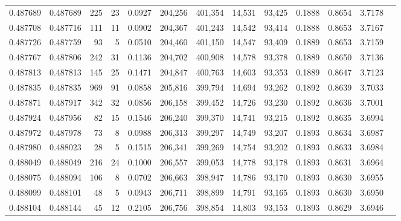 \begin{tabular}{rrrrrrrrrrrrr}
0.487689 & 0.487689 &   225 &    23 &                                     0.0927 & 204,256 & 401,354 &  14,531 &  93,425 & 0.1888 & 0.8654 & 3.7178 \\
0.487708 & 0.487716 &   111 &    11 &                                     0.0902 & 204,367 & 401,243 &  14,542 &  93,414 & 0.1888 & 0.8653 & 3.7167 \\
0.487726 & 0.487759 &    93 &     5 &                                     0.0510 & 204,460 & 401,150 &  14,547 &  93,409 & 0.1889 & 0.8653 & 3.7159 \\
0.487767 & 0.487806 &   242 &    31 &                                     0.1136 & 204,702 & 400,908 &  14,578 &  93,378 & 0.1889 & 0.8650 & 3.7136 \\
0.487813 & 0.487813 &   145 &    25 &                                     0.1471 & 204,847 & 400,763 &  14,603 &  93,353 & 0.1889 & 0.8647 & 3.7123 \\
0.487835 & 0.487835 &   969 &    91 &                                     0.0858 & 205,816 & 399,794 &  14,694 &  93,262 & 0.1892 & 0.8639 & 3.7033 \\
0.487871 & 0.487917 &   342 &    32 &                                     0.0856 & 206,158 & 399,452 &  14,726 &  93,230 & 0.1892 & 0.8636 & 3.7001 \\
0.487924 & 0.487956 &    82 &    15 &                                     0.1546 & 206,240 & 399,370 &  14,741 &  93,215 & 0.1892 & 0.8635 & 3.6994 \\
0.487972 & 0.487978 &    73 &     8 &                                     0.0988 & 206,313 & 399,297 &  14,749 &  93,207 & 0.1893 & 0.8634 & 3.6987 \\
0.487980 & 0.488023 &    28 &     5 &                                     0.1515 & 206,341 & 399,269 &  14,754 &  93,202 & 0.1893 & 0.8633 & 3.6984 \\
0.488049 & 0.488049 &   216 &    24 &                                     0.1000 & 206,557 & 399,053 &  14,778 &  93,178 & 0.1893 & 0.8631 & 3.6964 \\
0.488075 & 0.488094 &   106 &     8 &                                     0.0702 & 206,663 & 398,947 &  14,786 &  93,170 & 0.1893 & 0.8630 & 3.6955 \\
0.488099 & 0.488101 &    48 &     5 &                                     0.0943 & 206,711 & 398,899 &  14,791 &  93,165 & 0.1893 & 0.8630 & 3.6950 \\
0.488104 & 0.488144 &    45 &    12 &                                     0.2105 & 206,756 & 398,854 &  14,803 &  93,153 & 0.1893 & 0.8629 & 3.6946 \\

\end{tabular}

